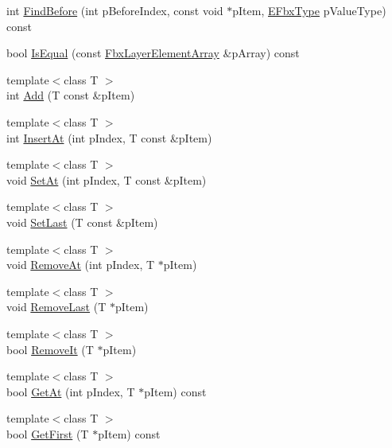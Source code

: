 \begin{DoxyCompactItemize}
\item 
int \hyperlink{class_fbx_layer_element_array_a98daeb1cd39978cda3a4dd83b32e508d}{Find\+Before} (int p\+Before\+Index, const void $\ast$p\+Item, \hyperlink{fbxpropertytypes_8h_a73913a5ddfb20e57c6f25e9e6784bd92}{E\+Fbx\+Type} p\+Value\+Type) const
\item 
bool \hyperlink{class_fbx_layer_element_array_a3e34cd89f4c2becbf6d114ac08de40ce}{Is\+Equal} (const \hyperlink{class_fbx_layer_element_array}{Fbx\+Layer\+Element\+Array} \&p\+Array) const
\item 
{\footnotesize template$<$class T $>$ }\\int \hyperlink{class_fbx_layer_element_array_aa7749da74c326ba0961f0a29a7ef2258}{Add} (T const \&p\+Item)
\item 
{\footnotesize template$<$class T $>$ }\\int \hyperlink{class_fbx_layer_element_array_accb9ce84c47d2a2f1a8c5e9967ef1f23}{Insert\+At} (int p\+Index, T const \&p\+Item)
\item 
{\footnotesize template$<$class T $>$ }\\void \hyperlink{class_fbx_layer_element_array_a9fae68bbccd7e41b8047c62d18fa8cce}{Set\+At} (int p\+Index, T const \&p\+Item)
\item 
{\footnotesize template$<$class T $>$ }\\void \hyperlink{class_fbx_layer_element_array_aebc103a4f95690e6aef3961b6198df3d}{Set\+Last} (T const \&p\+Item)
\item 
{\footnotesize template$<$class T $>$ }\\void \hyperlink{class_fbx_layer_element_array_a52b3592f2af5c98cf5eaa7e78b6a9c9b}{Remove\+At} (int p\+Index, T $\ast$p\+Item)
\item 
{\footnotesize template$<$class T $>$ }\\void \hyperlink{class_fbx_layer_element_array_a33eabc8ad1f5a95f5238a81293728717}{Remove\+Last} (T $\ast$p\+Item)
\item 
{\footnotesize template$<$class T $>$ }\\bool \hyperlink{class_fbx_layer_element_array_aca2bacda1beff3b7da61ed290a53cb19}{Remove\+It} (T $\ast$p\+Item)
\item 
{\footnotesize template$<$class T $>$ }\\bool \hyperlink{class_fbx_layer_element_array_abd796ea09c20089318a818cb73d2df05}{Get\+At} (int p\+Index, T $\ast$p\+Item) const
\item 
{\footnotesize template$<$class T $>$ }\\bool \hyperlink{class_fbx_layer_element_array_ae6f77a98d976ed7afbb8c455f0d26437}{Get\+First} (T $\ast$p\+Item) const

\end{DoxyCompactItemize}
